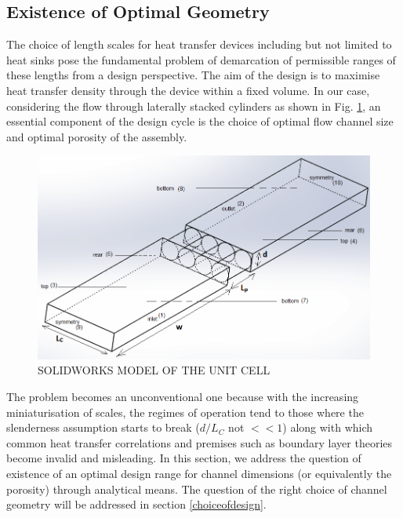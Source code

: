 \documentclass[twocolumn,10pt,cleanfoot]{ihmtc}
\begin{document}
\subsection{Existence of Optimal Geometry}\label{existence_dopt}
The choice of length scales for heat transfer devices including but not limited to heat sinks pose the fundamental problem of demarcation of permissible ranges of these lengths from a design perspective. The aim of the design is to maximise heat transfer density through the device within a fixed volume. In our case, considering the flow through laterally stacked cylinders as shown in Fig. \ref{simunitcell}, an essential component of the design cycle is the choice of  optimal flow channel size and optimal porosity of the assembly.
%
\begin{figure}[ht]
\centerline{\includegraphics[height=0.65\linewidth,width=1\linewidth]{simunitcell.png}}
\vspace{-1ex}
\caption{\small{SOLIDWORKS MODEL OF THE UNIT CELL}}
\vspace{-1.5em}
\label{simunitcell}
\end{figure}
%
The problem becomes an unconventional one because with the increasing miniaturisation of scales, the regimes of operation tend to those where the slenderness assumption starts to break ($d/L_C$ not $<< 1$) along with which common heat transfer correlations and premises such as boundary layer theories become invalid and misleading. In this section, we address the question of existence of an optimal design range for channel dimensions (or equivalently the porosity) through analytical means. The question of the right choice of channel geometry will  be addressed in section \ref{choiceofdesign}.
%
\end{document}
